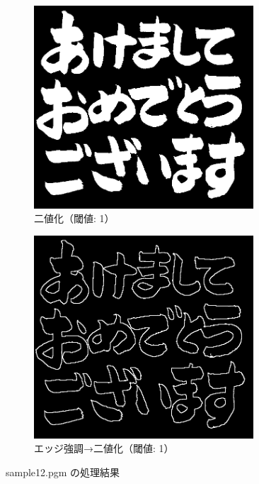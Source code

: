 \documentclass[a4paper,12pt]{jsarticle}
\begin{document}
\begin{figure}[!htbp]
\begin{subfigure}[b]{0.45\textwidth}
    \centering
    \includegraphics[width=0.9\textwidth]{./images/binarized_sample12_binary.png}
    \caption{二値化（閾値: 1）}
\end{subfigure}
\hfill
\begin{subfigure}[b]{0.45\textwidth}
    \centering
    \includegraphics[width=0.9\textwidth]{./images/combined_sample12_combined.png}
    \caption{エッジ強調→二値化（閾値: 1）}
\end{subfigure}
\caption{sample12.pgm の処理結果}
\label{fig:sample12}
\end{figure}
\end{document}
